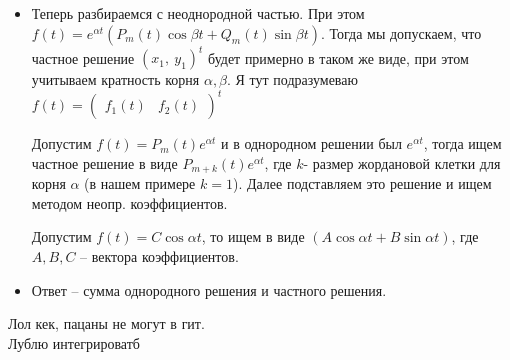 \documentclass[11pt]{article}
\begin{document}
\begin{itemize}
		\item Теперь разбираемся с неоднородной частью. При этом $f(t) = e^{\alpha t}(P_m(t)\cos \beta t + Q_m(t)\sin \beta t)$. 
		Тогда мы допускаем, что частное решение $(x_1, \ y_1)^t$ будет примерно в таком же виде, при этом учитываем кратность корня $\alpha, \beta$. Я тут подразумеваю $f(t) = \begin{pmatrix}
			f_1(t) & f_2(t)
		\end{pmatrix}^t$

		Допустим $f(t) = P_m(t)e^{\alpha t}$ и в однородном решении был $e^{\alpha t}$, тогда ищем частное решение в виде $P_{m + k}(t)e^{\alpha t}$, где $k$- размер жордановой
		клетки для корня $\alpha$ (в нашем примере $k = 1$). Далее подставляем это решение и ищем методом неопр. коэффициентов.

		Допустим $f(t) = C\cos \alpha t$, то ищем в виде $(A \cos \alpha t + B \sin \alpha t)$, где $A, B, C$ -- вектора коэффициентов. 

		\item Ответ -- сумма однородного решения и частного решения.
	\end{itemize}
	Лол кек, пацаны не могут в гит.\\
	Лублю интегрироватб
\end{document}
